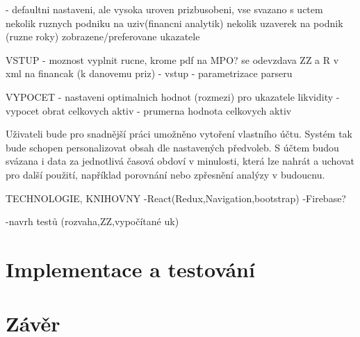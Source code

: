 - defaultni nastaveni, ale vysoka uroven prizbusobeni, vse svazano s uctem
 nekolik ruznych podniku na uziv(financni analytik)
 nekolik uzaverek na podnik (ruzne roky)
 zobrazene/preferovane ukazatele
 
VSTUP
- moznost vyplnit rucne, krome pdf na MPO? se odevzdava ZZ a R v xml na financak (k danovemu priz)
- vstup - parametrizace parseru


VYPOCET
- nastaveni optimalnich hodnot (rozmezi) pro ukazatele likvidity
- vypocet obrat celkovych aktiv - prumerna hodnota celkovych aktiv

Uživateli bude pro snadnější práci umožněno vytoření vlastního účtu. Systém tak bude schopen personalizovat obsah dle nastavených předvoleb. S účtem budou svázana i data za jednotlivá časová obdoví v minulosti, která lze nahrát a uchovat pro další použití, například porovnání nebo zpřesnění analýzy v budoucnu.

TECHNOLOGIE, KNIHOVNY
-React(Redux,Navigation,bootstrap)
-Firebase?

-navrh testů (rozvaha,ZZ,vypočítané uk)

\chapter{Implementace a testování}
\chapter{Závěr}
